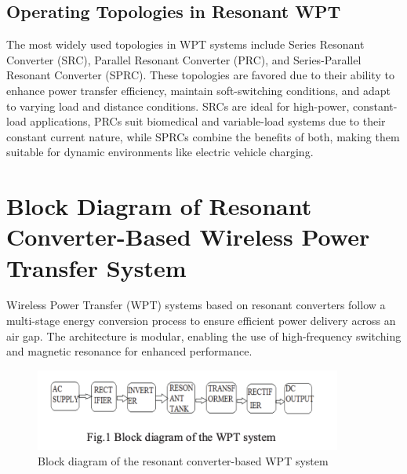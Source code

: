 \documentclass[12pt,a4paper]{report}
\begin{document}
 
\vspace{0.5cm}

\section{Operating Topologies in Resonant WPT}
\quad The most widely used topologies in WPT systems include Series Resonant Converter (SRC), Parallel Resonant Converter (PRC), and Series-Parallel Resonant Converter (SPRC). These topologies are favored due to their ability to enhance power transfer efficiency, maintain soft-switching conditions, and adapt to varying load and distance conditions. SRCs are ideal for high-power, constant-load applications, PRCs suit biomedical and variable-load systems due to their constant current nature, while SPRCs combine the benefits of both, making them suitable for dynamic environments like electric vehicle charging.








\chapter{Block Diagram of Resonant Converter-Based Wireless Power Transfer System}
\vspace{0.5cm}
\begin{center}

\end{center}
\quad Wireless Power Transfer (WPT) systems based on resonant converters follow a multi-stage energy conversion process to ensure efficient power delivery across an air gap. The architecture is modular, enabling the use of high-frequency switching and magnetic resonance for enhanced performance.

\begin{figure}[H]
    \centering
    \includegraphics[width=0.9\textwidth]{Untitled.png} %
    \caption{Block diagram of the resonant converter-based WPT system\cite{irivennela2020wireless}}
    \label{fig:wpt_block}
\end{figure}
\end{document}
